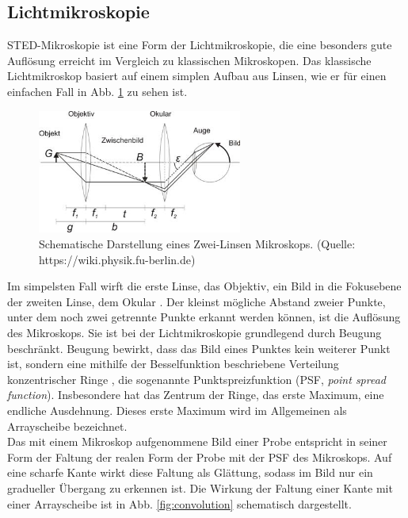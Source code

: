 \subsection{Lichtmikroskopie}
STED-Mikroskopie ist eine Form der Lichtmikroskopie, die eine besonders gute Auflösung erreicht im Vergleich zu klassischen Mikroskopen.
Das klassische Lichtmikroskop basiert auf einem simplen Aufbau aus Linsen, wie er für einen einfachen Fall in Abb. \ref{fig:lightmic} zu sehen ist.
\begin{figure}
	\centering
	\includegraphics[width=0.6\textwidth]{plots/micro.jpg}\caption{Schematische Darstellung eines Zwei-Linsen Mikroskops. (Quelle: https://wiki.physik.fu-berlin.de)}\label{fig:lightmic}
\end{figure}
Im simpelsten Fall wirft die erste Linse, das Objektiv, ein Bild in die Fokusebene der zweiten Linse, dem Okular \cite{Dem2}.
Der kleinst mögliche Abstand zweier Punkte, unter dem noch zwei getrennte Punkte erkannt werden können, ist die Auflösung des Mikroskops.
Sie ist bei der Lichtmikroskopie grundlegend durch Beugung beschränkt.
Beugung bewirkt, dass das Bild eines Punktes kein weiterer Punkt ist, sondern eine mithilfe der Besselfunktion beschriebene Verteilung konzentrischer Ringe \cite{Born}, die sogenannte Punktspreizfunktion (PSF, \emph{point spread function}).
Insbesondere hat das Zentrum der Ringe, das erste Maximum, eine endliche Ausdehnung.
Dieses erste Maximum wird im Allgemeinen als Arrayscheibe bezeichnet.
\\
Das mit einem Mikroskop aufgenommene Bild einer Probe entspricht in seiner Form der Faltung der realen Form der Probe mit der PSF des Mikroskops.
Auf eine scharfe Kante wirkt diese Faltung als Glättung, sodass im Bild nur ein gradueller Übergang zu erkennen ist.
Die Wirkung der Faltung einer Kante mit einer Arrayscheibe ist in Abb. \ref{fig:convolution} schematisch dargestellt.\\
